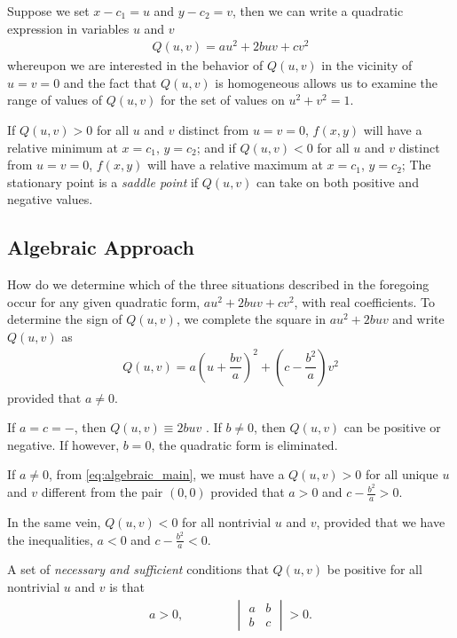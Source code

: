  Suppose we set $x-c_1 = u$ and $y - c_2 = v$, then we can write a quadratic expression in variables $u$ and $v$ \ie 
 \begin{align}
	Q(u,v) = au^2 + 2buv + cv^2
 \end{align}
 whereupon we are interested in the behavior of $Q(u,v)$ in the vicinity of $u=v=0$ and the fact that $Q(u,v)$ is homogeneous allows us to examine the range of values of $Q(u,v)$ for the set of values on $u^2 + v^2 = 1$. 
 
 If $Q(u,v) > 0$ for all $u$ and $v$ distinct from $u=v=0$, $f(x,y)$ will have a relative minimum at $x = c_1$, $y=c_2$; and if $Q(u,v) < 0$ for all $u$ and $v$ distinct from $u=v=0$, $f(x,y)$ will have a relative maximum at $x = c_1$, $y=c_2$; The stationary point is a \textit{saddle point} if $Q(u,v)$ can take on both positive and negative values.
  

 \subsection{Algebraic Approach}
 How do we determine which of the three situations described in the foregoing occur for any given quadratic form, $au^2 + 2buv +cv^2$, with real coefficients. To determine the sign of $Q(u,v)$, we complete the square in $au^2 + 2buv$ and write $Q(u,v)$ as 
 \begin{align}
 	Q(u,v) = a\left(u+\dfrac{bv}{a}\right)^2 +  \left(c-\dfrac{b^2}{a}\right)v^2
 	\label{eq:algebraic_main}
 \end{align}
 provided that $a \neq 0$. 
 
 If $a=c=-$, then $Q(u,v) \equiv 2buv$ . If $b\neq0$, then $Q(u,v)$ can be positive or negative. If however, $b=0$, the quadratic form is eliminated.
 
 If $a \neq 0$, from \eqref{eq:algebraic_main}, we must have a $Q(u,v) > 0$ for all unique $u$ and $v$ different from the pair $\left(0,0\right)$ provided that $a>0$ and $c - \frac{b^2}{a} >0$. 
 
 In the same vein, $Q(u,v) < 0$ for all nontrivial $u$ and $v$, provided that we have the inequalities, $a<0$ and $c - \frac{b^2}{a} < 0$.
 
\begin{tcolorbox}[title=Positivity Requirement]
	A set of \textit{necessary and sufficient} conditions that $Q(u,v)$ be positive for all nontrivial $u$ and $v$ is that 
	\begin{align}
		a > 0, \qquad \qquad \begin{vmatrix}
				a & b \\
		      b & c 
		\end{vmatrix} > 0.
	\end{align}
\end{tcolorbox}

